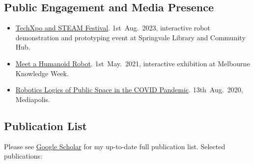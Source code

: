 \documentclass[11pt,letterpaper]{article}
\begin{document}
\subsection*{Public Engagement and Media Presence}
\begin{itemize}
  \item \href{https://libraries.greaterdandenong.vic.gov.au/about}{TechXpo and STEAM Festival}. 1st~Aug.~2023, interactive robot demonstration and prototyping event at Springvale Library and Community Hub.
  \item \href{https://mkw.melbourne.vic.gov.au/event/meet-a-humanoid-robot/}{Meet a Humanoid Robot}. 1st~May.~2021, interactive exhibition at Melbourne Knowledge Week.  
  \item \href{https://www.mediapolisjournal.com/2020/08/robotic-logics-of-public-space/}{Robotics Logics of Public Space in the COVID Pandemic}. 13th~Aug.~2020, Mediapolis.
\end{itemize}


\subsection*{Publication List}\label{pub_full}
Please see \href{https://scholar.google.com/citations?hl=en&user=d-PQpWgAAAAJ&view_op=list_works&sortby=pubdate}{Google Scholar} for my up-to-date full publication list. Selected publications:
\end{document}
